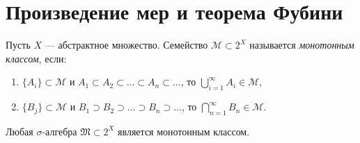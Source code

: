 \section{Произведение мер и теорема Фубини}
\begin{definition}
    Пусть $X$ — абстрактное множество. Семейство $\mathcal{M} \subset 2^X$ называется \textit{монотонным классом}, если:
    \begin{enumerate}
        \item $\{A_i\} \subset \mathcal{M}$ и $A_1 \subset A_2 \subset \dots \subset A_n \subset \dots$, то $\bigcup\limits_{i=1}^{\infty} A_i \in \mathcal{M}$,
        \item $\{B_j\} \subset \mathcal{M}$ и $B_1 \supset B_2 \supset \dots \supset B_n \supset \dots$, то $\bigcap\limits_{n=1}^{\infty}B_n \in \mathcal{M}$.
    \end{enumerate}
\end{definition} 

\begin{example}
    Любая $\sigma$-алгебра $\mathfrak{M} \subset 2^X$ является монотонным классом.
\end{example}

